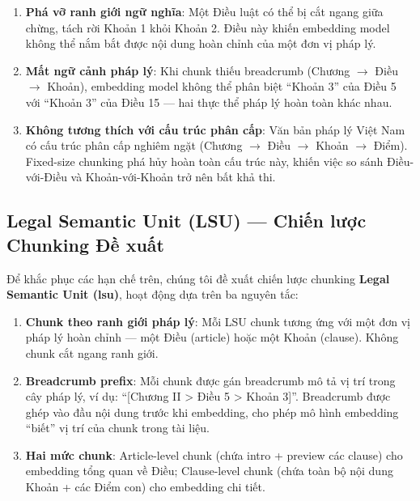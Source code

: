 \begin{enumerate}[label=(\arabic*)]
    \item \textbf{Phá vỡ ranh giới ngữ nghĩa}: Một Điều luật có thể bị cắt ngang giữa chừng, tách rời Khoản 1 khỏi Khoản 2. Điều này khiến embedding model không thể nắm bắt được nội dung hoàn chỉnh của một đơn vị pháp lý.
    \item \textbf{Mất ngữ cảnh pháp lý}: Khi chunk thiếu breadcrumb (Chương $\rightarrow$ Điều $\rightarrow$ Khoản), embedding model không thể phân biệt ``Khoản 3'' của Điều 5 với ``Khoản 3'' của Điều 15 — hai thực thể pháp lý hoàn toàn khác nhau.
    \item \textbf{Không tương thích với cấu trúc phân cấp}: Văn bản pháp lý Việt Nam có cấu trúc phân cấp nghiêm ngặt (Chương $\rightarrow$ Điều $\rightarrow$ Khoản $\rightarrow$ Điểm). Fixed-size chunking phá hủy hoàn toàn cấu trúc này, khiến việc so sánh Điều-với-Điều và Khoản-với-Khoản trở nên bất khả thi.
\end{enumerate}

\subsection{Legal Semantic Unit (LSU) — Chiến lược Chunking Đề xuất}

Để khắc phục các hạn chế trên, chúng tôi đề xuất chiến lược chunking \textbf{Legal Semantic Unit (\gls{lsu})}, hoạt động dựa trên ba nguyên tắc:

\begin{enumerate}[label=(\arabic*)]
    \item \textbf{Chunk theo ranh giới pháp lý}: Mỗi LSU chunk tương ứng với một đơn vị pháp lý hoàn chỉnh — một Điều (article) hoặc một Khoản (clause). Không chunk cắt ngang ranh giới.
    \item \textbf{Breadcrumb prefix}: Mỗi chunk được gán breadcrumb mô tả vị trí trong cây pháp lý, ví dụ: ``[Chương II > Điều 5 > Khoản 3]''. Breadcrumb được ghép vào đầu nội dung trước khi embedding, cho phép mô hình embedding ``biết'' vị trí của chunk trong tài liệu.
    \item \textbf{Hai mức chunk}: Article-level chunk (chứa intro + preview các clause) cho embedding tổng quan về Điều; Clause-level chunk (chứa toàn bộ nội dung Khoản + các Điểm con) cho embedding chi tiết.
\end{enumerate}

